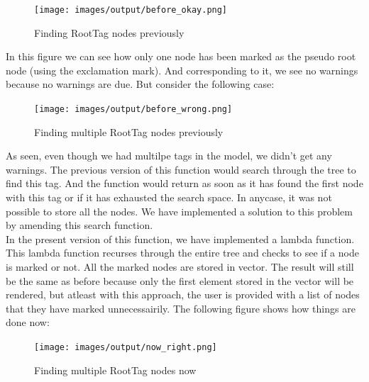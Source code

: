 \begin{figure}
	\centering
	\texttt{[image: images/output/before\_okay.png]}
	\caption{Finding RootTag nodes previously}
\end{figure}
In this figure we can see how only one node has been marked as the pseudo root node (using the exclamation mark). And corresponding to it, we see no warnings because no warnings are due. But consider the following case:\\
\begin{figure}
	\centering
	\texttt{[image: images/output/before\_wrong.png]}
	\caption{Finding multiple RootTag nodes previously}
\end{figure}
As seen, even though we had multilpe tags in the model, we didn't get any warnings.
The previous version of this function would search through the tree to find this tag. And the function would return as soon as it has found the first node with this tag or if it has exhausted the search space. In anycase, it was not possible to store all the nodes. We have implemented a solution to this problem by amending this search function.\\
In the present version of this function, we have implemented a lambda function. This lambda function recurses through the entire tree and checks to see if a node is marked or not. All the marked nodes are stored in vector. The result will still be the same as before because only the first element stored in the vector will be rendered, but atleast with this approach, the user is provided with a list of nodes that they have marked unnecessairily. The following figure shows how things are done now:\\
\begin{figure}
	\centering
	\texttt{[image: images/output/now\_right.png]}
	\caption{Finding multiple RootTag nodes now}
\end{figure}
